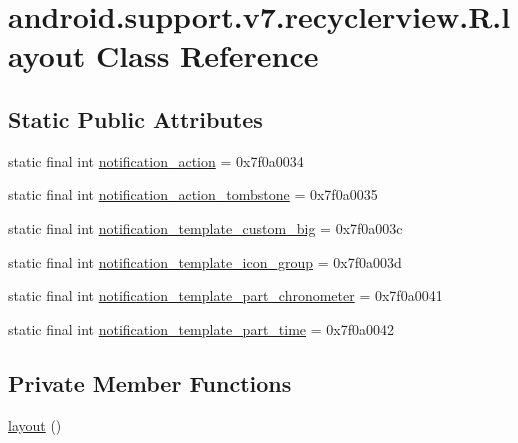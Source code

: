 \hypertarget{classandroid_1_1support_1_1v7_1_1recyclerview_1_1_r_1_1layout}{}\section{android.\+support.\+v7.\+recyclerview.\+R.\+layout Class Reference}
\label{classandroid_1_1support_1_1v7_1_1recyclerview_1_1_r_1_1layout}
\subsection*{Static Public Attributes}
\begin{DoxyCompactItemize}
\item 
static final int \mbox{\hyperlink{classandroid_1_1support_1_1v7_1_1recyclerview_1_1_r_1_1layout_a5c58833d9a1b10d067f374aed5fa88f3}{notification\+\_\+action}} = 0x7f0a0034
\item 
static final int \mbox{\hyperlink{classandroid_1_1support_1_1v7_1_1recyclerview_1_1_r_1_1layout_a7b89a41848c08f64c2517d5457a04b55}{notification\+\_\+action\+\_\+tombstone}} = 0x7f0a0035
\item 
static final int \mbox{\hyperlink{classandroid_1_1support_1_1v7_1_1recyclerview_1_1_r_1_1layout_ac2dc852a8025f03f100cf21a2a854492}{notification\+\_\+template\+\_\+custom\+\_\+big}} = 0x7f0a003c
\item 
static final int \mbox{\hyperlink{classandroid_1_1support_1_1v7_1_1recyclerview_1_1_r_1_1layout_ad5f28c2fee2a8a6a61a5f1e7529e5c07}{notification\+\_\+template\+\_\+icon\+\_\+group}} = 0x7f0a003d
\item 
static final int \mbox{\hyperlink{classandroid_1_1support_1_1v7_1_1recyclerview_1_1_r_1_1layout_aadc2d80b4aa5be9930a4997995d03772}{notification\+\_\+template\+\_\+part\+\_\+chronometer}} = 0x7f0a0041
\item 
static final int \mbox{\hyperlink{classandroid_1_1support_1_1v7_1_1recyclerview_1_1_r_1_1layout_ad713ea9b16efafde2a912cc78ef4bf05}{notification\+\_\+template\+\_\+part\+\_\+time}} = 0x7f0a0042
\end{DoxyCompactItemize}
\subsection*{Private Member Functions}
\begin{DoxyCompactItemize}
\item 
\mbox{\hyperlink{classandroid_1_1support_1_1v7_1_1recyclerview_1_1_r_1_1layout_a2fa854bea74345348bd16f131b111a84}{layout}} ()
\end{DoxyCompactItemize}


